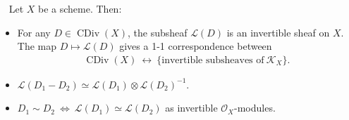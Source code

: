 \documentclass[11pt,a4paper,footinclude=true,headinclude=true]{scrbook} %
\DeclareMathOperator{\CDiv}{CDiv}
\newcommand{\KK}{\mathscr{K}}
\newcommand{\LL}{\mathscr{L}}
\newcommand{\OO}{\mathcal{O}}
\newcommand{\<}{\langle}
\newcommand{\>}{\rangle}
\newenvironment{proposition}[2][]
{\renewcommand\theinnercustomprop{#2}\innercustomprop[#1] 
\begin{mdframed}[backgroundcolor=gray!20]\ }
{\end{mdframed}\endinnercustomprop}
\begin{document}
\begin{proposition}{6.13}
    Let $X$ be a scheme. Then:
    \begin{itemize}
        \item[(a)] For any $D\in\CDiv(X)$, the subsheaf $\LL(D)$ is an invertible sheaf on $X$. The map $D\mapsto\LL(D)$ gives a 1-1 correspondence between
        \begin{align*}
            \CDiv(X)\ \longleftrightarrow\ \{\text{invertible subsheaves of}\ \KK_X\}.
        \end{align*}
        \item[(b)] $\LL(D_1-D_2)\simeq\LL(D_1)\otimes\LL(D_2)^{-1}$.
        \item[(c)] $D_1\sim D_2\ \Longleftrightarrow\ \LL(D_1)\simeq\LL(D_2)$ as invertible $\OO_X$-modules.
    \end{itemize}
\end{proposition}
\end{document}
